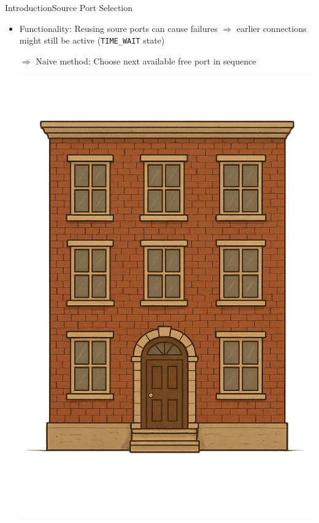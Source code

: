 \documentclass[aspectratio=169, hyperref={colorlinks=true, allcolors=SecondaryColor}, c]{beamer}
\begin{document}
\begin{frame}[fragile]{Introduction}{Source Port Selection}
	\begin{itemize}
		\item \alert{Functionality:} Reusing soure ports can cause failures $\Rightarrow$ earlier connections might still be active (\texttt{TIME\_WAIT} state)
		\item[$\Rightarrow$] \alert{Naive method:} Choose next available free port in sequence
		\begin{transformation}[0.2][0.6][0.2]
			\includegraphics[width=\textwidth]{./figures/apartment1.png}

\end{transformation}
\end{itemize}
\end{frame}
\end{document}
